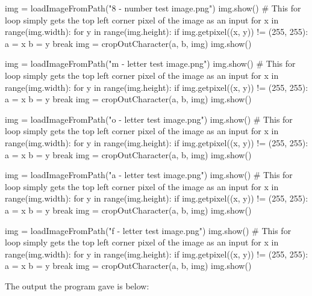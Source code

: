 \documentclass{report}
\begin{document}
\begin{python}
img = loadImageFromPath("8 - number test image.png")
img.show()
# This for loop simply gets the top left corner pixel of the image as an input
for x in range(img.width):
    for y in range(img.height):
        if img.getpixel((x, y)) != (255, 255):
            a = x
            b = y
            break
img = cropOutCharacter(a, b, img)
img.show()

img = loadImageFromPath("m - letter test image.png")
img.show()
# This for loop simply gets the top left corner pixel of the image as an input
for x in range(img.width):
    for y in range(img.height):
        if img.getpixel((x, y)) != (255, 255):
            a = x
            b = y
            break
img = cropOutCharacter(a, b, img)
img.show()

img = loadImageFromPath("o - letter test image.png")
img.show()
# This for loop simply gets the top left corner pixel of the image as an input
for x in range(img.width):
    for y in range(img.height):
        if img.getpixel((x, y)) != (255, 255):
            a = x
            b = y
            break
img = cropOutCharacter(a, b, img)
img.show()

img = loadImageFromPath("a - letter test image.png")
img.show()
# This for loop simply gets the top left corner pixel of the image as an input
for x in range(img.width):
    for y in range(img.height):
        if img.getpixel((x, y)) != (255, 255):
            a = x
            b = y
            break
img = cropOutCharacter(a, b, img)
img.show()

img = loadImageFromPath("f - letter test image.png")
img.show()
# This for loop simply gets the top left corner pixel of the image as an input
for x in range(img.width):
    for y in range(img.height):
        if img.getpixel((x, y)) != (255, 255):
            a = x
            b = y
            break
img = cropOutCharacter(a, b, img)
img.show()
\end{python}
The output the program gave is below:
\end{document}
